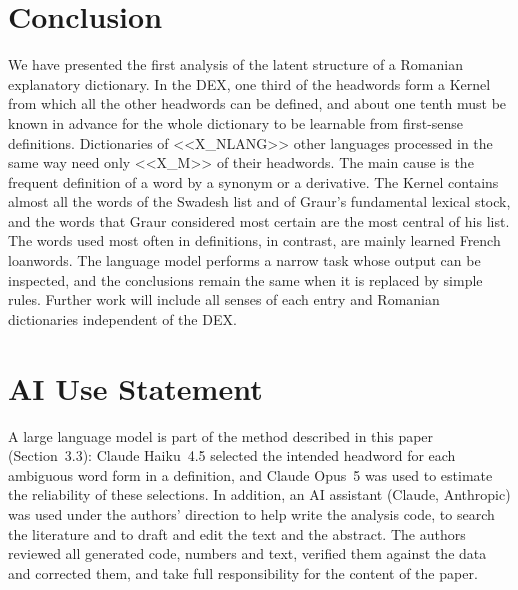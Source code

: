 \documentclass[11pt]{article}
\begin{document}
\section{Conclusion}
We have presented the first analysis of the latent structure of a Romanian explanatory dictionary. In the DEX, one third of the headwords form a Kernel from which all the other headwords can be defined, and about one tenth must be known in advance for the whole dictionary to be learnable from first-sense definitions. Dictionaries of <<X_NLANG>> other languages processed in the same way need only <<X_M>> of their headwords. The main cause is the frequent definition of a word by a synonym or a derivative. The Kernel contains almost all the words of the Swadesh list and of Graur's fundamental lexical stock, and the words that Graur considered most certain are the most central of his list. The words used most often in definitions, in contrast, are mainly learned French loanwords. The language model performs a narrow task whose output can be inspected, and the conclusions remain the same when it is replaced by simple rules. Further work will include all senses of each entry and Romanian dictionaries independent of the DEX.

\section*{AI Use Statement}
A large language model is part of the method described in this paper (Section~3.3): Claude Haiku~4.5 \cite{anthropic_models} selected the intended headword for each ambiguous word form in a definition, and Claude Opus~5 was used to estimate the reliability of these selections. In addition, an AI assistant (Claude, Anthropic) was used under the authors' direction to help write the analysis code, to search the literature and to draft and edit the text and the abstract. The authors reviewed all generated code, numbers and text, verified them against the data and corrected them, and take full responsibility for the content of the paper.



\end{document}
